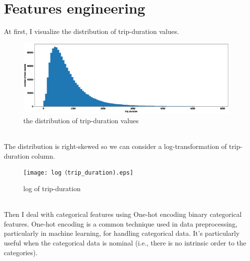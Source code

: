 \section{Features engineering} \label{sec-Features engineering}


At first, I visualize the distribution of trip-duration values.
\begin{figure}[h]
	\centering
	\includegraphics[scale=0.3]{trip_duration.eps}
	\caption{the distribution of trip-duration values}
\end{figure}
\\
The distribution is right-skewed so we can consider a log-transformation of trip-duration column.
\begin{figure}[h]
	\centering
	\texttt{[image: log（trip\_duration).eps]}
	\caption{log of trip-duration}
\end{figure}
\\
Then I deal with categorical features using One-hot encoding binary categorical features. One-hot encoding is a common technique used in data preprocessing, particularly in machine learning, for handling categorical data. It’s particularly useful when the categorical data is nominal (i.e., there is no intrinsic order to the
categories). 
\\
